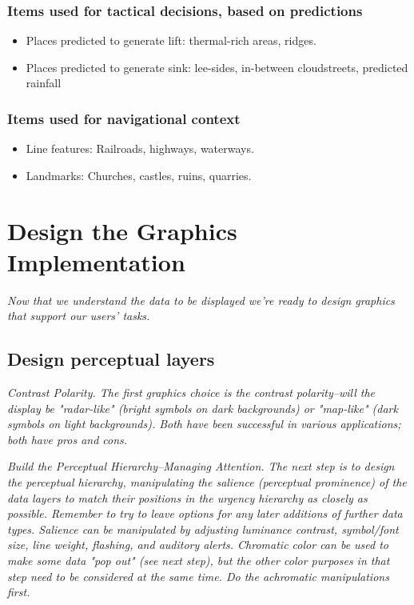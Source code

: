 \documentclass{article}
\newcommand{\myquote}[1]
{
	\textit{#1}
}
\begin{document}
\subsubsection{Items used for tactical decisions, based on predictions}
\begin{itemize}
\item Places predicted to generate lift: thermal-rich areas, ridges.
\item Places predicted to generate sink: lee-sides, in-between cloudstreets,
	predicted rainfall
\end{itemize}

\subsubsection{Items used for navigational context}
\begin{itemize}
\item Line features: Railroads, highways, waterways.
\item Landmarks: Churches, castles, ruins, quarries.
\end{itemize}

\section{Design the Graphics Implementation}
\myquote{Now that we understand the data to be displayed we're ready to design graphics that support our users' tasks.}
\subsection{Design perceptual layers}
\myquote{\emph{Contrast Polarity.} The first graphics choice is the contrast polarity--will the display be "radar-like" (bright symbols on dark backgrounds) or "map-like" (dark symbols on light backgrounds). Both have been successful in various applications; both have pros and cons.}

\myquote{\emph{Build the Perceptual Hierarchy--Managing Attention.} The next step is to design the perceptual hierarchy, manipulating the salience (perceptual prominence) of the data layers to match their positions in the urgency hierarchy as closely as possible. Remember to try to leave options for any later additions of further data types. Salience can be manipulated by adjusting luminance contrast, symbol/font size, line weight, flashing, and auditory alerts. Chromatic color can be used to make some data "pop out" (see next step), but the other color purposes in that step need to be considered at the same time. Do the achromatic manipulations first.}
\end{document}
